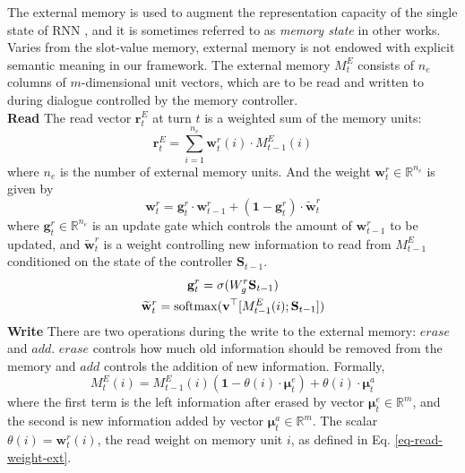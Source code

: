 The external memory is used to augment the representation capacity of the single state of RNN , and it is sometimes referred to as {\em memory state} \cite{wang2016memory} in other works. Varies from the slot-value memory, external memory is not endowed with explicit semantic meaning in our framework. The external memory $M_t^E$ consists of $n_e$ columns of $m$-dimensional unit vectors, which are to be read and written to during dialogue controlled by the memory controller.
\\{\bf Read}
The read vector $\mathbf{r}_t^E$ at turn $t$ is a weighted sum of the memory units:
\begin{equation}
    \mathbf{r}_t^E=\sum_{i=1}^{n_e}\mathbf{w}_t^r(i){\cdot}M_{t-1}^E(i)
\end{equation}
where $n_e$ is the number of external memory units. And the weight $\mathbf{w}_t^r\in\mathbb{R}^{n_e}$ is given by
\begin{equation}
\label{eq-read-weight-ext}
    \mathbf{w}_t^r={\bm{g}_t^r}{\cdot}{\mathbf{w}_{t-1}^r}+(\mathbf{1}-\bm{g}_t^r){\cdot}{\widetilde{\mathbf{w}}_t^r}
\end{equation}
where $\mathbf{g}_t^r{\in}\mathbb{R}^{n_e}$ is an update gate which controls the amount of $\mathbf{w}_{t-1}^r$ to be updated, and $\widetilde{\mathbf{w}}_t^r$ is a weight controlling new information to read from $M_{t-1}^E$ conditioned on the state of the controller $\mathbf{S}_{t-1}$.
\begin{gather}
    \mathbf{g}_t^r=\sigma({W_g^r}{\mathbf{S}_{t-1}}) \\
    \widetilde{\mathbf{w}}_t^r={\rm softmax}(\mathbf{v}^\top[M_{t-1}^E(i);\mathbf{S}_{t-1}]) 
\end{gather}
%
{\bf Write}
There are two operations during the write to the external memory: $erase$ and $add$. $erase$ controls how much old information should be removed from the memory and $add$ controls the addition of new information. Formally, 
\begin{equation}
    M_t^E(i)=M_{t-1}^E(i)(\mathbf{1}-\theta(i){\cdot}\bm{\mu}_t^e)+\theta(i){\cdot}\bm{\mu}_t^a
\end{equation}
%
where the first term is the left information after erased by vector $\bm{\mu}_t^e \in \mathbb{R}^m$, and the second is new information added by vector $\bm{\mu}_t^a \in \mathbb{R}^m$. The scalar $\theta(i)=\bm{w}_t^r(i)$, the read weight on memory unit $i$, as defined in Eq. \ref{eq-read-weight-ext}.


